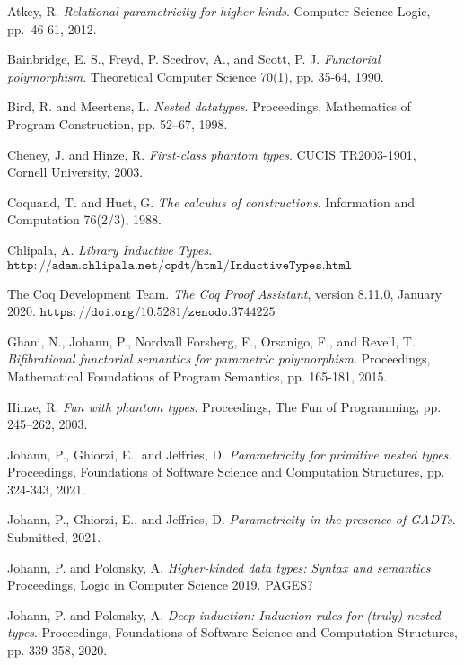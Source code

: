 \documentclass[9pt]{entcs}
\begin{document}
\begin{thebibliography}{10}\label{bibliography}

 Atkey, R.  {\em Relational parametricity for higher
  kinds}.  Computer Science Logic, pp.~46-61, 2012.

 Bainbridge, E. S., Freyd, P. Scedrov, A., and Scott,
  P. J. {\em Functorial polymorphism}. Theoretical Computer Science
  70(1), pp. 35-64, 1990.

 Bird, R. and Meertens, L. {\em Nested
  datatypes}. Proceedings, Mathematics of Program Construction,
  pp. 52–67, 1998.

 Cheney, J. and Hinze, R. {\em First-class phantom
 types}. CUCIS TR2003-1901, Cornell University, 2003.

 Coquand, T. and Huet, G. {\em The calculus of
  constructions}. Information and Computation 76(2/3), 1988.

 Chlipala, A. {\em Library Inductive
  Types}. $\mathtt{http://adam.chlipala.net/cpdt/html/InductiveTypes.html}$

 The Coq Development Team. {\em The Coq Proof
  Assistant}, version 8.11.0, January 2020.
  $\mathtt{https://doi.org/10.5281/zenodo.3744225}$

 Ghani, N., Johann, P., Nordvall Forsberg, F.,
  Orsanigo, F., and Revell, T. {\em Bifibrational functorial semantics
    for parametric polymorphism}. Proceedings, Mathematical
  Foundations of Program Semantics, pp. 165-181, 2015.

 Hinze, R. {\em Fun with phantom types}. Proceedings,
 The Fun of Programming, pp. 245–262, 2003.

 Johann, P., Ghiorzi, E., and Jeffries, D. {\em
  Parametricity for primitive nested types}. Proceedings, Foundations
  of Software Science and Computation Structures, pp. 324-343, 2021.

 Johann, P., Ghiorzi, E., and Jeffries, D. {\em
  Parametricity in the presence of GADTs}. Submitted, 2021.

 Johann, P. and Polonsky, A. {\em Higher-kinded data
  types: Syntax and semantics} Proceedings, Logic in Computer Science
  2019. {\color{red} PAGES?}

 Johann, P. and Polonsky, A. {\em Deep induction:
  Induction rules for (truly) nested types}.  Proceedings, Foundations
  of Software Science and Computation Structures, pp. 339-358, 2020.


\end{thebibliography}
\end{document}

